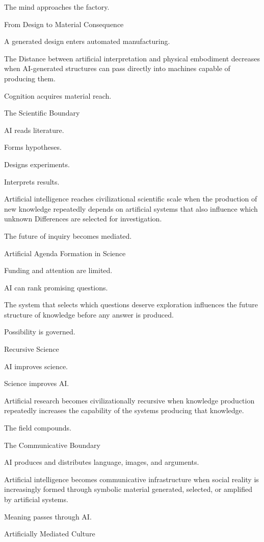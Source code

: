 The mind approaches the factory.

From Design to Material Consequence

A generated design enters automated manufacturing.

The Distance between artificial interpretation and physical embodiment decreases when AI-generated structures can pass directly into machines capable of producing them.

Cognition acquires material reach.

The Scientific Boundary

AI reads literature.

Forms hypotheses.

Designs experiments.

Interprets results.

Artificial intelligence reaches civilizational scientific scale when the production of new knowledge repeatedly depends on artificial systems that also influence which unknown Differences are selected for investigation.

The future of inquiry becomes mediated.

Artificial Agenda Formation in Science

Funding and attention are limited.

AI can rank promising questions.

The system that selects which questions deserve exploration influences the future structure of knowledge before any answer is produced.

Possibility is governed.

Recursive Science

AI improves science.

Science improves AI.

Artificial research becomes civilizationally recursive when knowledge production repeatedly increases the capability of the systems producing that knowledge.

The field compounds.

The Communicative Boundary

AI produces and distributes language, images, and arguments.

Artificial intelligence becomes communicative infrastructure when social reality is increasingly formed through symbolic material generated, selected, or amplified by artificial systems.

Meaning passes through AI.

Artificially Mediated Culture


